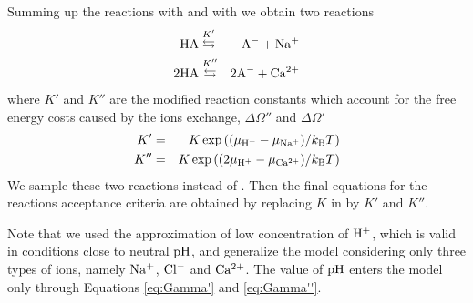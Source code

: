 \documentclass{elsarticle}
\begin{document}
Summing up the reactions  with  and with 
we obtain two reactions
\begin{eqnarray}
    \mathrm{HA}&\stackrel{K'}{\leftrightarrows}&\mathrm{A}^{-}+\mathrm{Na^+}\label{eq: acid reaction na}\\
    2\mathrm{HA}&\stackrel{K''}{\leftrightarrows}&2\mathrm{A}^{-}+\mathrm{Ca^{2+}}\label{eq: acid reaction ca}
\end{eqnarray}
where $K'$ and $K''$ are the modified reaction constants which account for the free energy costs caused by the ions exchange, $\Delta\Omega''$ and $\Delta\Omega'$
\begin{eqnarray}
    K' &=& K \exp\left((\mu_{\mathrm{H^+}}-\mu_{\mathrm{Na^+}})/k_\mathrm{B}T\right) \label{eq:Gamma'}\\
    K'' &=& K \exp\left((2\mu_{\mathrm{H^+}}-\mu_{\mathrm{Ca^{2+}}})/k_\mathrm{B}T\right)\label{eq:Gamma''}
\end{eqnarray}
We sample these two reactions instead of .
Then the final equations for the reactions acceptance criteria are obtained by replacing $K$
in  by $K'$ and $K''$.

Note that we used the approximation of low concentration of $\mathrm{H^+}$,
which is valid in conditions close to neutral $\mathrm{pH}$,
and generalize the model considering only three types of ions, namely $\mathrm{Na^+}$, $\mathrm{Cl^-}$ and $\mathrm{Ca^{2+}}$.
The value of $\mathrm{pH}$ enters the model only through Equations \ref{eq:Gamma'} and \ref{eq:Gamma''}.








\newpage
\pagebreak
\end{document}
